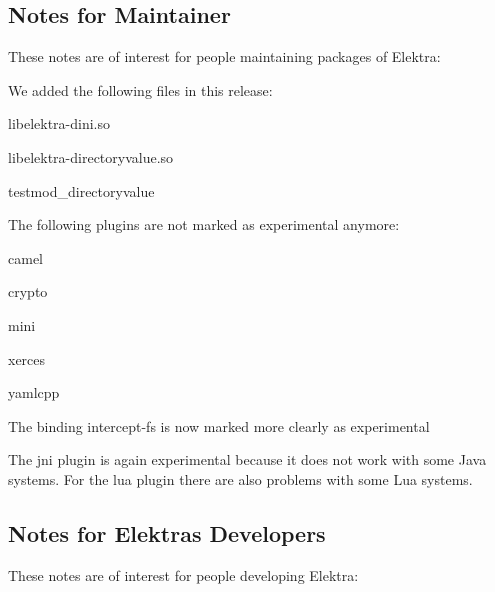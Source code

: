 \subsection*{Notes for Maintainer}

These notes are of interest for people maintaining packages of Elektra\+:


\begin{DoxyItemize}
\item We added the following files in this release\+:
\begin{DoxyItemize}
\item {\ttfamily libelektra-\/dini.\+so}
\item {\ttfamily libelektra-\/directoryvalue.\+so}
\item {\ttfamily testmod\+\_\+directoryvalue}
\end{DoxyItemize}
\item The following plugins are not marked as experimental anymore\+:
\begin{DoxyItemize}
\item {\ttfamily camel}
\item {\ttfamily crypto}
\item {\ttfamily mini}
\item {\ttfamily xerces}
\item {\ttfamily yamlcpp}
\end{DoxyItemize}
\item The binding {\ttfamily intercept-\/fs} is now marked more clearly as experimental
\item The {\ttfamily jni} plugin is again experimental because it does not work with some Java systems. For the {\ttfamily lua} plugin there are also problems with some Lua systems.
\end{DoxyItemize}

\subsection*{Notes for Elektra\textquotesingle{}s Developers}

These notes are of interest for people developing Elektra\+:


